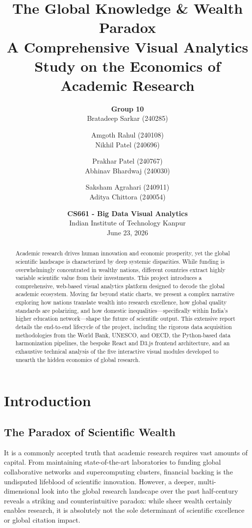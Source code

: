 \documentclass[12pt,a4paper]{article}
\title{\vspace{-2cm}\textbf{\huge The Global Knowledge \& Wealth Paradox}\\[0.5cm]
\Large A Comprehensive Visual Analytics Study on the Economics of Academic Research}
\author{
\textbf{Group 10} \\ 
Bratadeep Sarkar (240285) \and Amgoth Rahul (240108) \\
Nikhil Patel (240696) \and Prakhar Patel (240767) \\
Abhinav Bhardwaj (240030) \and Saksham Agrahari (240911) \\
Aditya Chittora (240054)
}
\date{\vspace{0.5cm} \textbf{CS661 - Big Data Visual Analytics} \\ Indian Institute of Technology Kanpur \\ June 23, 2026}
\begin{document}
\maketitle
\thispagestyle{plain}

\begin{abstract}
\noindent Academic research drives human innovation and economic prosperity, yet the global scientific landscape is characterized by deep systemic disparities. While funding is overwhelmingly concentrated in wealthy nations, different countries extract highly variable scientific value from their investments. This project introduces a comprehensive, web-based visual analytics platform designed to decode the global academic ecosystem. Moving far beyond static charts, we present a complex narrative exploring how nations translate wealth into research excellence, how global quality standards are polarizing, and how domestic inequalities---specifically within India's higher education network---shape the future of scientific output. This extensive report details the end-to-end lifecycle of the project, including the rigorous data acquisition methodologies from the World Bank, UNESCO, and OECD, the Python-based data harmonization pipelines, the bespoke React and D3.js frontend architecture, and an exhaustive technical analysis of the five interactive visual modules developed to unearth the hidden economics of global research.
\end{abstract}

\newpage
\tableofcontents
\newpage

\section{Introduction}
\subsection{The Paradox of Scientific Wealth}
It is a commonly accepted truth that academic research requires vast amounts of capital. From maintaining state-of-the-art laboratories to funding global collaborative networks and supercomputing clusters, financial backing is the undisputed lifeblood of scientific innovation. However, a deeper, multi-dimensional look into the global research landscape over the past half-century reveals a striking and counterintuitive paradox: while sheer wealth certainly enables research, it is absolutely not the sole determinant of scientific excellence or global citation impact.
\end{document}
